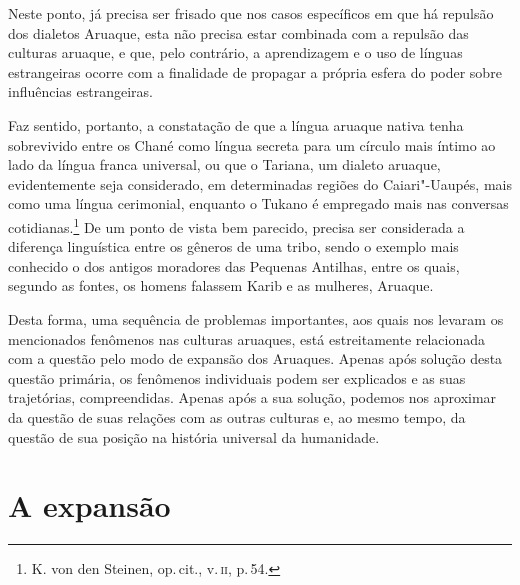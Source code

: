 Neste ponto, já precisa ser frisado que nos casos específicos em que há
repulsão dos dialetos Aruaque, esta não precisa estar combinada com a
repulsão das culturas aruaque, e que, pelo contrário, a aprendizagem e o
uso de línguas estrangeiras ocorre com a finalidade de propagar a
própria esfera do poder sobre influências estrangeiras.

Faz sentido, portanto, a constatação de que a língua aruaque nativa tenha sobrevivido entre os Chané
como língua secreta para um círculo mais íntimo ao lado da língua franca universal,
ou que o Tariana, um dialeto aruaque, evidentemente seja considerado, em
determinadas regiões do Caiari"-Uaupés, mais como uma língua cerimonial,
enquanto o Tukano é empregado mais nas conversas cotidianas.\footnote{K.
  von den Steinen, op.\,cit., v.\,\textsc{ii}, p.\,54.} De um ponto de vista bem
parecido, precisa ser considerada a diferença linguística entre os gêneros 
de uma tribo, sendo o exemplo mais conhecido o dos antigos
moradores das Pequenas Antilhas, entre os quais, segundo as fontes, os
homens falassem Karib e as mulheres, Aruaque.

Desta forma, uma sequência de problemas importantes, aos quais nos
levaram os mencionados fenômenos nas culturas aruaques, está
estreitamente relacionada com a questão pelo modo de expansão dos
Aruaques. Apenas após solução desta questão primária, os fenômenos
individuais podem ser explicados e as suas trajetórias, compreendidas.
Apenas após a sua solução, podemos nos aproximar da questão de suas
relações com as outras culturas e, ao mesmo tempo, da questão de sua
posição na história universal da humanidade.


\chapter*{A expansão\smallskip{}}

